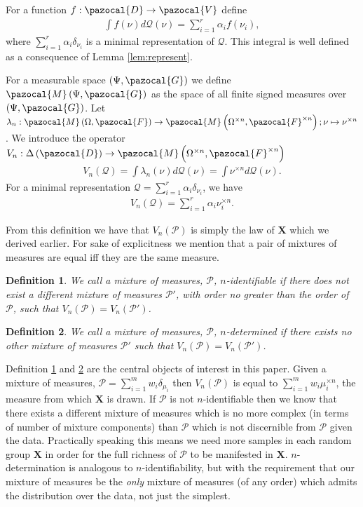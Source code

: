 \documentclass[aos]{imsart}
\def\sF{\pazocal{F}}
\def\sG{\pazocal{G}}
\def\sM{\pazocal{M}}
\def\sD{\pazocal{D}}
\def\sV{\pazocal{V}}
\def\sP{\mathscr{P}}
\def\sQ{\mathscr{Q}}
\def\bX{\mathbf{X}}
\def\dd{\Delta\left( \sD \right)}
\theoremstyle{plain}
\theoremstyle{defintion}
\newtheorem{defin}{Definition}[section]
\begin{document}
	For a function $f:\sD \to \sV$ define
	\begin{eqnarray*}
		\int f(\nu) d\sQ(\nu) = \sum_{i=1}^r \alpha_i f\left( \nu_i \right),
	\end{eqnarray*}
	where $\sum_{i=1}^r  \alpha_i\delta_{\nu_i}$ is a minimal representation of $\sQ$. This integral is well defined as a consequence of Lemma \ref{lem:represent}.

	For a measurable space $\left(\Psi, \sG \right)$ we define $\sM \left(\Psi, \sG \right)$ as the space of all finite signed measures over $\left(\Psi, \sG \right)$. Let $\lambda_n:\sM\left( \Omega, \sF \right) \to \sM\left( \Omega^{\times n}, \sF^{\times n}\right);\nu \mapsto \nu^{\times n}$. We introduce the operator $V_n:\dd\to \sM\left( \Omega^{\times n}, \sF^{\times n} \right)$
	\begin{eqnarray*}
		V_n(\sQ) = \int \lambda_n(\nu) d\sQ\left( \nu \right)= \int \nu^{\times n} d\sQ\left( \nu \right).
	\end{eqnarray*}
	For a minimal representation $\sQ =\sum_{i=1}^r  \alpha_i\delta_{\nu_i}$, we have
	\begin{eqnarray*}
		V_n(\sQ) =\sum_{i=1}^r  \alpha_i\nu_i^{\times n}.
	\end{eqnarray*}

	From this definition we have that $V_n\left( \sP \right)$ is simply the law of $\bX$ which we derived earlier. For sake of explicitness we mention that a pair of mixtures of measures are equal iff they are the same measure.

	\begin{defin}\label{def:ident}
		We call a mixture of measures, $\sP$, \emph{$n$-identifiable} if there does not exist a different mixture of measures $\sP'$, with order no greater than the order of $\sP$, such that $V_n\left( \sP \right) = V_n\left( \sP' \right)$.
	\end{defin}
	\begin{defin}\label{def:det}
		We call a mixture of measures, $\sP$, \emph{$n$-determined} if there exists no other mixture of measures $\sP'$ such that $V_n\left( \sP \right) = V_n\left( \sP' \right)$. 
	\end{defin}

	Definition \ref{def:ident} and \ref{def:det} are the central objects of interest in this paper. Given a mixture of measures, $\sP = \sum_{i=1}^m w_i\delta_{\mu_i}$ then $V_n(\sP)$ is equal to $\sum_{i=1}^m w_i \mu_i^{\times n}$, the measure from which $\bX$ is drawn. If $\sP$ is not $n$-identifiable then we know that there exists a different mixture of measures which is no more complex (in terms of number of mixture components) than $\sP$ which is not discernible from $\sP$ given the data. Practically speaking this means we need more samples in each random group $\bX$ in order for the full richness of $\sP$ to be manifested in $\bX$. $n$-determination is analogous to $n$-identifiability, but with the requirement that our mixture of measures be the {\em only} mixture of measures (of any order) which admits the distribution over the data, not just the simplest.
\end{document}
